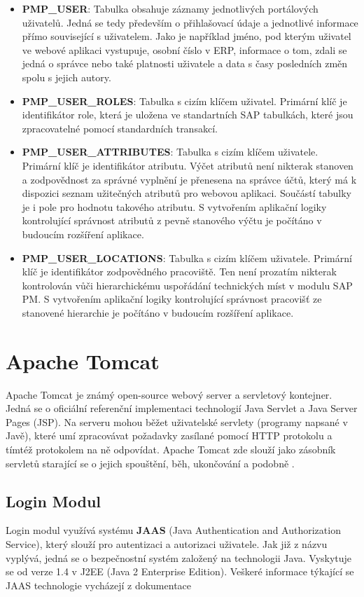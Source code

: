 \documentclass[thesis=M,czech]{FITthesis}[2012/06/26]
\begin{document}
\begin{itemize}
	\item
	\textbf{PMP\_USER}: Tabulka obsahuje záznamy jednotlivých portálových uživatelů. Jedná se tedy především o přihlašovací údaje a jednotlivé informace přímo související s uživatelem. Jako je například jméno, pod kterým uživatel ve webové aplikaci vystupuje, osobní číslo v ERP, informace o tom, zdali se jedná o správce nebo také platnosti uživatele a data s časy posledních změn spolu s jejich autory.
	\item
	\textbf{PMP\_USER\_ROLES}: Tabulka s cizím klíčem uživatel. Primární klíč je identifikátor role, která je uložena ve standartních SAP tabulkách, které jsou zpracovatelné pomocí standardních transakcí.
	\item
	\textbf{PMP\_USER\_ATTRIBUTES}: Tabulka s cizím klíčem uživatele. Primární klíč je identifikátor atributu. Výčet atributů není nikterak stanoven a zodpovědnost za správné vyplnění je přenesena na správce účtů, který má k dispozici seznam užitečných atributů pro webovou aplikaci. Součástí tabulky je i pole pro hodnotu takového atributu. S vytvořením aplikační logiky kontrolující správnost atributů z pevně stanového výčtu je počítáno v budoucím rozšíření aplikace.
	\item
	\textbf{PMP\_USER\_LOCATIONS}: Tabulka s cizím klíčem uživatele. Primární klíč je identifikátor zodpovědného pracoviště. Ten není prozatím nikterak kontrolován vůči hierarchickému uspořádání technických míst v modulu SAP PM. S vytvořením aplikační logiky kontrolující správnost pracovišť ze stanovené hierarchie je počítáno v budoucím rozšíření aplikace.
\end{itemize} 

\section{Apache Tomcat}
Apache Tomcat je známý open-source webový server a servletový kontejner. Jedná se o oficiální referenční implementaci technologií Java Servlet a Java Server Pages (JSP). Na serveru mohou běžet uživatelské servlety (programy napsané v Javě), které umí zpracovávat požadavky zasílané pomocí HTTP protokolu a tímtéž protokolem na ně odpovídat. Apache Tomcat zde slouží jako zásobník servletů starající se o jejich spouštění, běh, ukončování a podobně \cite{tomcat}.

\subsection{Login Modul}
\label{ssec:login_modul}
Login modul využívá systému \textbf{JAAS} (Java Authentication and Authorization Service), který slouží pro autentizaci a autorizaci uživatele. Jak již z názvu vyplývá, jedná se o bezpečnostní systém založený na technologii Java. Vyskytuje se od verze 1.4 v J2EE (Java 2 Enterprise Edition). Veškeré informace týkající se JAAS technologie vycházejí z dokumentace \cite{jaas}
\end{document}
